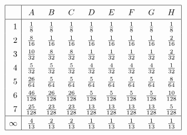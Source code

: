 \documentclass{standalone}
\begin{document}
$\def\arraystretch{1.4}
\begin{array}{|r|cccccccc|} \hline
& A & B & C & D & E & F & G & H \\
\hline
1 & \frac{1}{8} & \frac{1}{8} & \frac{1}{8} & \frac{1}{8} & \frac{1}{8} & \frac{1}{8} & \frac{1}{8} & \frac{1}{8}\\
2 & \frac{8}{16} & \frac{1}{16} & \frac{1}{16} & \frac{1}{16} & \frac{1}{16} & \frac{1}{16} & \frac{1}{16} & \frac{2}{16}\\
3 & \frac{10}{32} & \frac{8}{32} & \frac{8}{32} & \frac{1}{32} & \frac{1}{32} & \frac{1}{32} & \frac{1}{32} & \frac{2}{32}\\
4 & \frac{5}{32} & \frac{5}{32} & \frac{5}{32} & \frac{4}{32} & \frac{4}{32} & \frac{4}{32} & \frac{4}{32} & \frac{1}{32}\\
5 & \frac{26}{64} & \frac{5}{64} & \frac{5}{64} & \frac{5}{64} & \frac{5}{64} & \frac{5}{64} & \frac{5}{64} & \frac{8}{64}\\
6 & \frac{46}{128} & \frac{26}{128} & \frac{26}{128} & \frac{5}{128} & \frac{5}{128} & \frac{5}{128} & \frac{5}{128} & \frac{10}{128}\\
7 & \frac{25}{128} & \frac{23}{128} & \frac{23}{128} & \frac{13}{128} & \frac{13}{128} & \frac{13}{128} & \frac{13}{128} & \frac{5}{128}\\
\hline
\infty & \frac{4}{13} & \frac{2}{13} & \frac{2}{13} & \frac{1}{13} & \frac{1}{13} & \frac{1}{13} & \frac{1}{13} & \frac{1}{13} \\
\hline
\end{array}
$
\end{document}
